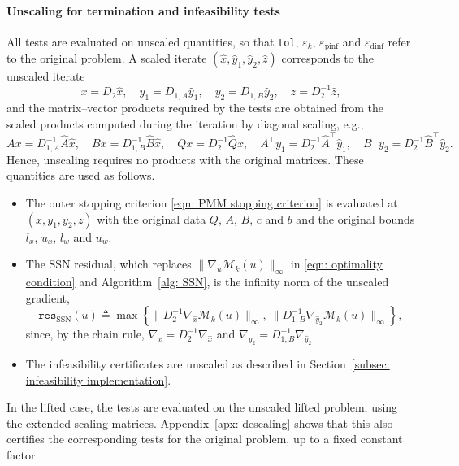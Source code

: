 \paragraph{Unscaling for termination and infeasibility tests} All tests are evaluated on unscaled quantities, so that \texttt{tol}, $\varepsilon_k$, $\varepsilon_{\mathrm{pinf}}$ and $\varepsilon_{\mathrm{dinf}}$ refer to the original problem. A scaled iterate $(\hat{x},\hat{y}_1,\hat{y}_2,\hat{z})$ corresponds to the unscaled iterate
\[
    x = D_2 \hat{x}, \quad y_1 = D_{1,A} \hat{y}_1, \quad y_2 = D_{1,B} \hat{y}_2, \quad z = D_2^{-1} \hat{z},
\]
and the matrix--vector products required by the tests are obtained from the scaled products computed during the iteration by diagonal scaling, e.g.,
\[
    Ax = D_{1,A}^{-1} \hat{A}\hat{x}, \quad Bx = D_{1,B}^{-1} \hat{B}\hat{x}, \quad Qx = D_2^{-1} \hat{Q}\hat{x}, \quad A^\top y_1 = D_2^{-1} \hat{A}^\top \hat{y}_1, \quad B^\top y_2 = D_2^{-1} \hat{B}^\top \hat{y}_2.
\]
Hence, unscaling requires no products with the original matrices. These quantities are used as follows.
\begin{itemize}
    \item The outer stopping criterion \eqref{eqn: PMM stopping criterion} is evaluated at $(x,y_1,y_2,z)$ with the original data $Q$, $A$, $B$, $c$ and $b$ and the original bounds $l_x$, $u_x$, $l_w$ and $u_w$.
    \item The SSN residual, which replaces $\|\nabla_u \mathcal{M}_k(u)\|_\infty$ in \eqref{eqn: optimality condition} and Algorithm~\ref{alg: SSN}, is the infinity norm of the unscaled gradient,
    \begin{equation} \label{eqn: descaled SSN residual}
        \texttt{res}_{\mathrm{SSN}}(u) \triangleq \max\left\{ \|D_2^{-1} \nabla_{\hat{x}} \mathcal{M}_k(u)\|_\infty,\ \|D_{1,B}^{-1} \nabla_{\hat{y}_2} \mathcal{M}_k(u)\|_\infty \right\},
    \end{equation}
    since, by the chain rule, $\nabla_x = D_2^{-1} \nabla_{\hat{x}}$ and $\nabla_{y_2} = D_{1,B}^{-1} \nabla_{\hat{y}_2}$.
    \item The infeasibility certificates are unscaled as described in Section~\ref{subsec: infeasibility implementation}.
\end{itemize}
In the lifted case, the tests are evaluated on the unscaled lifted problem, using the extended scaling matrices. Appendix~\ref{apx: descaling} shows that this also certifies the corresponding tests for the original problem, up to a fixed constant factor.


